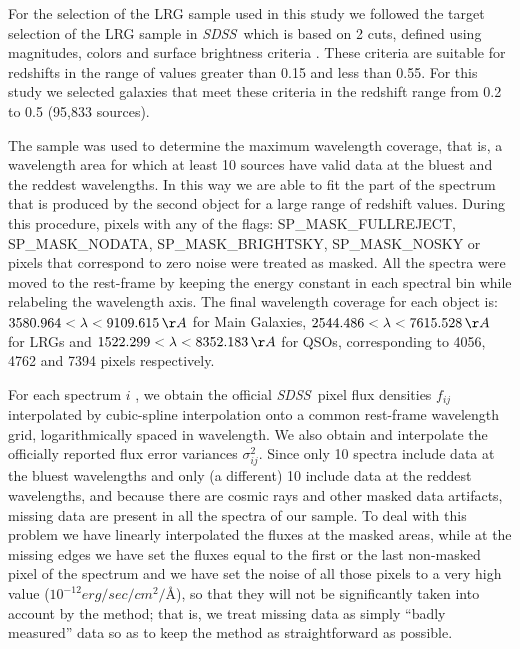 \documentclass[12pt,preprint]{aastex}
\newcommand{\project}[1]{\textsl{#1}}
\newcommand{\sdss}{\project{SDSS}}
\newcommand{\SDSS}{\sdss}
\begin{document}
For the selection of the LRG sample used in this study we followed the
target selection of the LRG sample in \SDSS\ which is based on 2 cuts,
defined using magnitudes, colors and surface brightness criteria
\citep{eisenstein}. These criteria are suitable for
redshifts in the range of values greater than 0.15 and less than 0.55. For 
this study we selected galaxies that meet these criteria in the redshift range 
from 0.2 to 0.5 (95,833 sources). 

The sample was used to determine the maximum wavelength coverage, that
is, a wavelength area for which at least 10 sources have valid data at
the bluest and the reddest wavelengths. In this way we are able to
fit the part of the spectrum that is produced by the second object for
a large range of redshift values. During this procedure, pixels with
any of the flags: SP\_MASK\_FULLREJECT, SP\_MASK\_NODATA,
SP\_MASK\_BRIGHTSKY, SP\_MASK\_NOSKY or pixels that correspond to zero
noise were treated as masked. All the spectra were
moved to the rest-frame by keeping the energy constant in each
spectral bin while relabeling the wavelength axis.  The final
wavelength coverage for each object is:
$3580.964<\lambda<9109.615\,\AA$ for Main Galaxies,
$2544.486<\lambda<7615.528\,\AA$ for LRGs and
$1522.299<\lambda<8352.183\,\AA$ for QSOs, corresponding to 4056, 4762
and 7394 pixels respectively.

For each spectrum $i$ , we obtain the official \SDSS\ pixel flux densities $f_{ij}$
interpolated by cubic-spline interpolation onto a common rest-frame
wavelength grid, logarithmically spaced in wavelength.  We also obtain
and interpolate the officially reported flux error variances
$\sigma_{ij}^2$.  Since only 10 spectra include data at the bluest
wavelengths and only (a different) 10 include data at the reddest
wavelengths, and because there are cosmic rays and other masked data
artifacts, missing data are present in all the spectra of our
sample. To deal with this problem we have linearly interpolated the 
fluxes at the masked areas, while at the missing edges we have set the fluxes 
equal to the first or the last non-masked pixel of the spectrum and 
we have set the noise of all those pixels to a very high value
($10^{-12} erg/sec/cm^2/$\AA), so that they will not be significantly
taken into account by the method; that is, we treat missing data as
simply ``badly measured'' data so as to keep the method as
straightforward as possible.
\end{document}
